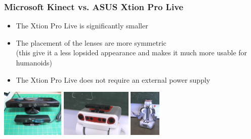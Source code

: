 \begin{frame}
 \frametitle{Microsoft Kinect vs. ASUS Xtion Pro Live}
\begin{itemize}
  \item The Xtion Pro Live is significantly smaller
  \item The placement of the lenses are more symmetric \\(this give it a less lopsided appearance and makes it much more usable for humanoids)
  \item The Xtion Pro Live does not require an external power supply
\end{itemize}
\vspace{3ex}\hspace{6ex}\includegraphics[width=3cm]{../images/kinect_vs_xtion.jpg} \hspace{1ex}
\includegraphics[width=3.38cm]{../images/IMG_1195.JPG} \hspace{1ex}
\includegraphics[width=1.5cm]{../images/IMG_1200.JPG}
\end{frame}


